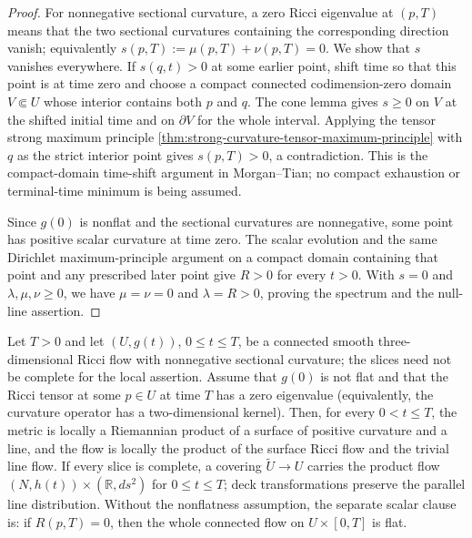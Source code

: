 \begin{proof}
For nonnegative sectional curvature, a zero Ricci eigenvalue at $(p,T)$
means that the two sectional curvatures containing the corresponding
direction vanish; equivalently $s(p,T):=\mu(p,T)+\nu(p,T)=0$.  We show
that $s$ vanishes everywhere.  If $s(q,t)>0$ at some earlier point, shift
time so that this point is at time zero and choose a compact connected
codimension-zero domain $V\Subset U$ whose interior contains both $p$ and
$q$.  The cone lemma gives $s\ge0$ on $V$ at the shifted initial time and
on $\partial V$ for the whole interval.  Applying the tensor strong
maximum principle
\ref{thm:strong-curvature-tensor-maximum-principle} with $q$ as the
strict interior point gives $s(p,T)>0$, a contradiction.  This is the
compact-domain time-shift argument in Morgan--Tian; no compact exhaustion
or terminal-time minimum is being assumed.

Since $g(0)$ is nonflat and the sectional curvatures are nonnegative, some
point has positive scalar curvature at time zero.  The scalar evolution and
the same Dirichlet maximum-principle argument on a compact domain containing
that point and any prescribed later point give $R>0$ for every $t>0$.
With $s=0$ and $\lambda,\mu,\nu\ge0$, we have $\mu=\nu=0$ and
$\lambda=R>0$, proving the spectrum and the null-line assertion.
\end{proof}

\begin{theorem}
\label{thm:curvature-null-splitting}
\notready
Let $T>0$ and let $(U,g(t))$, $0\le t\le T$, be a connected smooth
three-dimensional Ricci flow with nonnegative sectional curvature; the
slices need not be complete for the local assertion.  Assume that $g(0)$ is
not flat and that the Ricci tensor at some $p\in U$ at time $T$ has a zero
eigenvalue (equivalently, the curvature operator has a two-dimensional
kernel).  Then, for every $0<t\le T$, the metric is locally a Riemannian
product of a surface of positive curvature and a line, and the flow is
locally the product of the surface Ricci flow and the trivial line flow.  If
every slice is complete, a covering
$\widetilde U\to U$ carries the product flow
$(N,h(t))\times(\mathbb R,ds^2)$ for $0\le t\le T$; deck
transformations preserve the parallel line distribution.  Without the
nonflatness assumption, the separate scalar clause is: if
$R(p,T)=0$, then the whole connected flow on $U\times[0,T]$ is flat.
\end{theorem}

